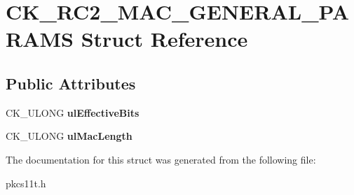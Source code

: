 \hypertarget{struct_c_k___r_c2___m_a_c___g_e_n_e_r_a_l___p_a_r_a_m_s}{}\section{C\+K\+\_\+\+R\+C2\+\_\+\+M\+A\+C\+\_\+\+G\+E\+N\+E\+R\+A\+L\+\_\+\+P\+A\+R\+A\+MS Struct Reference}
\label{struct_c_k___r_c2___m_a_c___g_e_n_e_r_a_l___p_a_r_a_m_s}
\subsection*{Public Attributes}
\begin{DoxyCompactItemize}
\item 
\mbox{\label{struct_c_k___r_c2___m_a_c___g_e_n_e_r_a_l___p_a_r_a_m_s_aa77745a17e02336c24ce0f1a77ba0844}} 
C\+K\+\_\+\+U\+L\+O\+NG {\bfseries ul\+Effective\+Bits}
\item 
\mbox{\label{struct_c_k___r_c2___m_a_c___g_e_n_e_r_a_l___p_a_r_a_m_s_afb7e767a2898dbb3a13e86a2799fc5b5}} 
C\+K\+\_\+\+U\+L\+O\+NG {\bfseries ul\+Mac\+Length}
\end{DoxyCompactItemize}


The documentation for this struct was generated from the following file\+:\begin{DoxyCompactItemize}
\item 
pkcs11t.\+h\end{DoxyCompactItemize}
